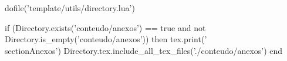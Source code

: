 \documentclass[12pt]{article}
\begin{document}
    
    

    \hypersetup{pageanchor=false}
    \setcounter{page}{1}
    
    
    
    
    \hypersetup{pageanchor=true}
    \setcounter{page}{3}
    
    
    \nocite{*}

    
    
    
    \pagebreak
    \begin{luacode}
        dofile('template/utils/directory.lua')

        if (Directory.exists('conteudo/anexos') == true and not Directory.is_empty('conteudo/anexos')) then
            tex.print('\\section{Anexos}')
            Directory.tex.include_all_tex_files('./conteudo/anexos')
        end

    \end{luacode}
\end{document}
